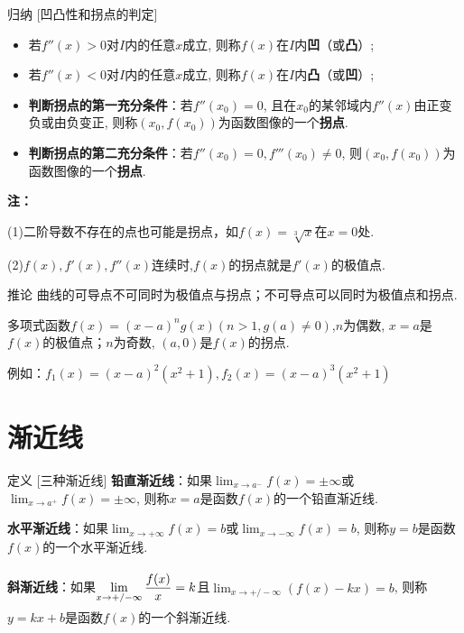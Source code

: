 \documentclass[a4paper,12pt,oneside,fontset=none]{ctexbook}
\let\olddfrac\dfrac
\renewcommand{\dfrac}[2]{
    \olddfrac{#1\vrule width 0pt height 1.15em depth 0em}{#2\vrule width 0pt height 0em depth 0.6em}
}
\let\oldlim\lim
\renewcommand{\lim}{\displaystyle\oldlim}
\newenvironment{corollary}[1][]{\begin{thmBox}{推论}{#1}}{\end{thmBox}}
\newenvironment{induction}[1][]{\begin{thmBox}{归纳}{#1}}{\end{thmBox}}
\newcounter{definition}[chapter]
\newenvironment{definition}[1][]{\begin{defBox}{定义}{#1}}{\end{defBox}}
\newenvironment{note}{
    \par\vspace{0.5em}\noindent
    \textbf{\color{NoteColor} 注：}
}{
    \par\vspace{0.5em}
}
\numberwithin{equation}{chapter}
\begin{document}
\begin{induction}
    [凹凸性和拐点的判定]
    \begin{itemize}
        \item 若$f''(x) > 0$对$I$内的任意$x$成立, 则称$f(x)$在$I$内\textbf{凹}（或\textbf{凸}）;
        \item 若$f''(x) < 0$对$I$内的任意$x$成立, 则称$f(x)$在$I$内\textbf{凸}（或\textbf{凹}）;
        \item \textbf{判断拐点的第一充分条件}：若$f''(x_0) = 0$, 且在$x_0$的某邻域内$f''(x)$由正变负或由负变正, 则称$(x_0, f(x_0))$为函数图像的一个\textbf{拐点}.
        \item \textbf{判断拐点的第二充分条件}：若$f''(x_0)=0, f'''(x_0) \neq 0$, 则$(x_0, f(x_0))$为函数图像的一个\textbf{拐点}.
    \end{itemize}
\end{induction}
\begin{note}
    (1)二阶导数不存在的点也可能是拐点，如$f(x)=\sqrt[3]{x}$在$x=0$处.

    (2)$f(x),f'(x),f''(x)$连续时,$f(x)$的拐点就是$f'(x)$的极值点.
\end{note}

\begin{corollary}
    曲线的可导点不可同时为极值点与拐点；不可导点可以同时为极值点和拐点.

    多项式函数$f(x) = (x-a)^ng(x)(n>1,g(a)\neq 0)$,$n$为偶数, $x=a$是$f(x)$的极值点；$n$为奇数, $(a,0)$是$f(x)$的拐点.
    
    例如：$f_1(x) = (x-a)^2(x^2+1), f_2(x) = (x-a)^3(x^2+1)$
\end{corollary}

\section{渐近线}
\begin{definition}
    [三种渐近线]
    \textbf{铅直渐近线}：如果$\lim_{x \to a^-} f(x) = \pm \infty$或$\lim_{x \to a^+} f(x) = \pm \infty$, 则称$x=a$是函数$f(x)$的一个铅直渐近线.

    \textbf{水平渐近线}：如果$\lim_{x \to +\infty} f(x) = b$或$\lim_{x \to -\infty} f(x) = b$, 则称$y=b$是函数$f(x)$的一个水平渐近线.

    \textbf{斜渐近线}：如果$\lim_{x \to +/-\infty} \dfrac{f(x)}{x} = k$且$\lim_{x \to +/-\infty} (f(x) - kx) = b$, 则称$y = kx + b$是函数$f(x)$的一个斜渐近线.
\end{definition}
\end{document}
